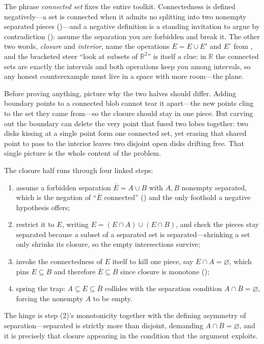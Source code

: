 \documentclass[main.tex]{subfiles}
\begin{document}
\begin{Reflection}
The phrase \emph{connected set} fixes the entire toolkit. Connectedness is defined negatively---a set is
connected when it admits no splitting into two nonempty separated pieces ()---and a
negative definition is a standing invitation to argue by contradiction (): assume the
separation you are forbidden and break it. The other two words, \emph{closure} and \emph{interior}, name
the operations $\overline E=E\cup E'$ and $E^{\circ}$ from , and the bracketed steer ``look
at subsets of $\mathbb R^2$'' is itself a clue: in $\mathbb R$ the connected sets are exactly the
intervals and both operations keep you among intervals, so any honest counterexample must live in a
space with more room---the plane.

Before proving anything, picture why the two halves should differ. Adding boundary points to a connected
blob cannot tear it apart---the new points cling to the set they came from---so the closure should stay
in one piece. But carving out the boundary can delete the very point that fused two lobes together: two
disks kissing at a single point form one connected set, yet erasing that shared point to pass to the
interior leaves two disjoint open disks drifting free. That single picture is the whole content of the
problem.

The closure half runs through four linked steps:
\begin{enumerate}[leftmargin=1.7em,itemsep=3pt,topsep=2pt,label=\textnormal{(\arabic*)}]
  \item assume a forbidden separation $\overline E=A\cup B$ with $A,B$ nonempty separated, which is the
        negation of ``$\overline E$ connected'' () and the only foothold a negative
        hypothesis offers;
  \item restrict it to $E$, writing $E=(E\cap A)\cup(E\cap B)$, and check the pieces stay separated
        because a subset of a separated set is separated---shrinking a set only shrinks its closure, so
        the empty intersections survive;
  \item invoke the connectedness of $E$ itself to kill one piece, say $E\cap A=\varnothing$, which pins
        $E\subseteq B$ and therefore $\overline E\subseteq\overline B$ since closure is monotone
        ();
  \item spring the trap: $A\subseteq\overline E\subseteq\overline B$ collides with the separation
        condition $A\cap\overline B=\varnothing$, forcing the nonempty $A$ to be empty.
\end{enumerate}
The hinge is step (2)'s monotonicity together with the defining asymmetry of separation---separated is
strictly more than disjoint, demanding $A\cap\overline B=\varnothing$, and it is precisely that closure
appearing in the condition that the argument exploits.


\end{Reflection}
\end{document}
